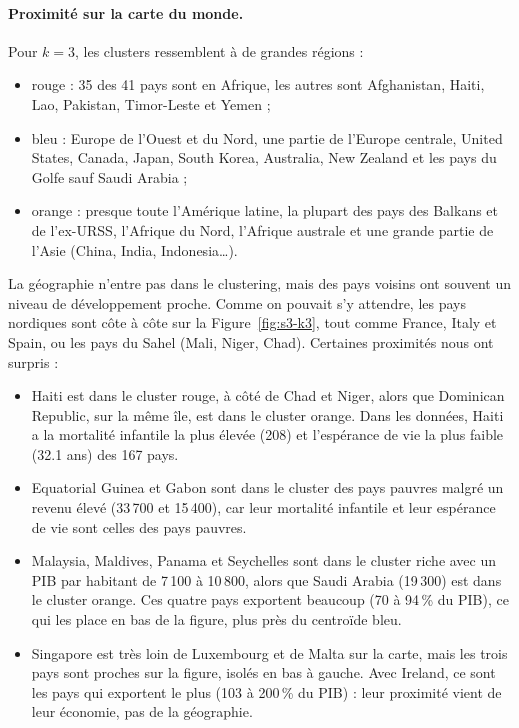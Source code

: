 \documentclass[11pt,a4paper]{article}
\renewcommand{\_}{\underscoreorig\allowbreak}
\begin{document}
\paragraph{Proximité sur la carte du monde.} Pour $k = 3$, les clusters ressemblent à de grandes régions :
\begin{itemize}
  \item rouge : 35 des 41 pays sont en Afrique, les autres sont Afghanistan, Haiti, Lao, Pakistan, Timor-Leste et Yemen ;
  \item bleu : Europe de l'Ouest et du Nord, une partie de l'Europe centrale, United States, Canada, Japan, South Korea, Australia, New Zealand et les pays du Golfe sauf Saudi Arabia ;
  \item orange : presque toute l'Amérique latine, la plupart des pays des Balkans et de l'ex-URSS, l'Afrique du Nord, l'Afrique australe et une grande partie de l'Asie (China, India, Indonesia\dots).
\end{itemize}
La géographie n'entre pas dans le clustering, mais des pays voisins ont souvent un niveau de développement proche. Comme on pouvait s'y attendre, les pays nordiques sont côte à côte sur la Figure~\ref{fig:s3-k3}, tout comme France, Italy et Spain, ou les pays du Sahel (Mali, Niger, Chad). Certaines proximités nous ont surpris :
\begin{itemize}
  \item Haiti est dans le cluster rouge, à côté de Chad et Niger, alors que Dominican Republic, sur la même île, est dans le cluster orange. Dans les données, Haiti a la mortalité infantile la plus élevée (208) et l'espérance de vie la plus faible (32.1 ans) des 167 pays.
  \item Equatorial Guinea et Gabon sont dans le cluster des pays pauvres malgré un revenu élevé (33\,700 et 15\,400), car leur mortalité infantile et leur espérance de vie sont celles des pays pauvres.
  \item Malaysia, Maldives, Panama et Seychelles sont dans le cluster riche avec un PIB par habitant de 7\,100 à 10\,800, alors que Saudi Arabia (19\,300) est dans le cluster orange. Ces quatre pays exportent beaucoup (70 à 94\,\% du PIB), ce qui les place en bas de la figure, plus près du centroïde bleu.
  \item Singapore est très loin de Luxembourg et de Malta sur la carte, mais les trois pays sont proches sur la figure, isolés en bas à gauche. Avec Ireland, ce sont les pays qui exportent le plus (103 à 200\,\% du PIB) : leur proximité vient de leur économie, pas de la géographie.
\end{itemize}
\end{document}
